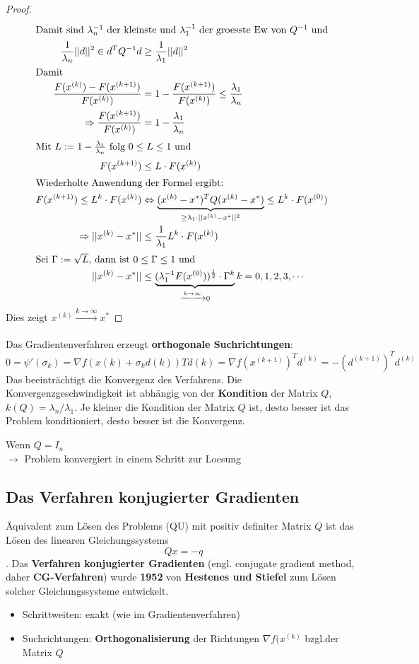 \begin{proof}
\begin{align*}
\intertext{Damit sind $\lambda_n^{-1} $ der kleinste und $\lambda_1^{-1}$ der groesste Ew von $Q^{-1}$ und }
\frac{1}{\lambda_n} ||d||^2 \in d^TQ^{-1}d &\geq \frac{1}{\lambda_1}||d||^2\\
\intertext{Damit }
\frac{F(x^{(k)})-F(x^{(k+1)})}{F(x^{(k)})} &= 1-\frac{F(x^{(k+1)})}{F(x^{(k)})}\leq \frac{\lambda_1}{\lambda_n}\\
\Rightarrow \frac{F(x^{(k+1)})}{F(x^{(k)})} &=1-\frac{\lambda_1}{\lambda_n}\\
\intertext{Mit $L:=1-\frac{\lambda_1}{\lambda_n}$ folg $0\leq L\leq 1$ und}
F(x^{(k+1)})&\leq L\cdot F(x^{(k)})\\
\intertext{Wiederholte Anwendung der Formel ergibt:}
F(x^{(k+1)}) \leq L^k\cdot F(x^{(k)}) &\Leftrightarrow \underbrace{(x^{(k)}-x^{*})^TQ(x^{(k)}-x^{*})}_{\geq \lambda_1\cdot||x^{(k)}-x^{*}||^2}\leq L^k\cdot F(x^{(0)})\\
\Rightarrow ||x^{(k)}-x^{*}|| &\leq \frac{1}{\lambda_1}L^k\cdot F(x^{(k)})\\
\intertext{Sei $\Gamma := \sqrt{L}$, dann ist $0 \leq \Gamma \le 1$ und}
||x^{(k)}-x^{*}|| &\leq \underbrace{(\lambda_1^{-1}F(x^{(0)}))^\frac{1}{2}\cdot \Gamma^k}_{\xrightarrow[]{k \rightarrow \infty} 0} \hfill k=0,1,2,3,\cdots
\end{align*}
Dies zeigt $x^{(k)} \xrightarrow[]{k \rightarrow \infty} x^{*}$
\end{proof}
Das Gradientenverfahren erzeugt \textbf{orthogonale Suchrichtungen}:
$$0 = \psi'(\sigma_k) = \nabla f(x(k) + \sigma_k d(k))Td(k) = \nabla f(x^{(k+1)})^Td^{(k)} = -(d^{(k+1)})^T d^{(k)}$$
Das beeinträchtigt die Konvergenz des Verfahrens.
Die Konvergenzgeschwindigkeit ist abhängig von der \textbf{Kondition} der Matrix $Q$,
$k(Q) = \lambda_n /\lambda_1$.
Je kleiner die Kondition der Matrix $Q$ ist, desto besser ist das Problem konditioniert, desto besser ist die Konvergenz.
\begin{Beispiel}
	Wenn $Q=I_n$\\
	$\rightarrow$ Problem konvergiert in einem Schritt zur Loesung
\end{Beispiel}
\subsection{Das Verfahren konjugierter Gradienten}
Äquivalent zum Lösen des Problems (QU) mit positiv definiter Matrix $Q$
ist das Lösen des linearen Gleichungssystems
$$Qx = -q$$.
Das \textbf{Verfahren konjugierter Gradienten} (engl. conjugate gradient method, daher \textbf{CG-Verfahren}) wurde \textbf{1952} von \textbf{Hestenes und Stiefel} zum Lösen solcher Gleichungssysteme entwickelt.
\begin{itemize}
	\item Schrittweiten: exakt (wie im Gradientenverfahren)
	\item Suchrichtungen: \textbf{Orthogonalisierung} der Richtungen $\nabla f(x^{(k)}$ bzgl.der Matrix $Q$
\end{itemize}
